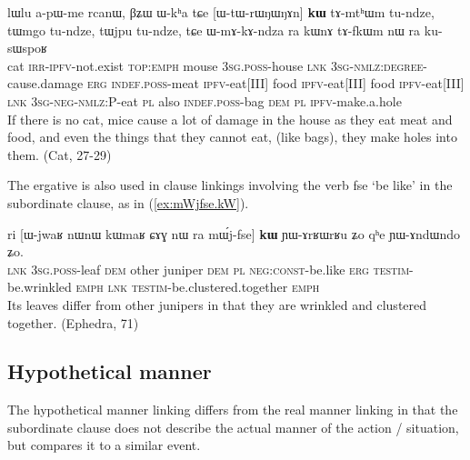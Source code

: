 \documentclass[oldfontcommands,oneside,a4paper,11pt]{article}
\newcommand{\ipa}[1]{{\phon \mbox{#1}}} %
\newcommand{\refb}[1]{(\ref{#1})}
\begin{document}
\begin{exe}
\ex \label{ex:WtWrWNWNAn}
\gll
\ipa{lɯlu}         	\ipa{a-pɯ-me}         	\ipa{rcanɯ,}         	\ipa{βʑɯ}         	\ipa{ɯ-kʰa}         	\ipa{tɕe}         	[\ipa{ɯ-tɯ-rɯŋɯŋɤn}]         	\ipa{\textbf{kɯ}}          \ipa{tɤ-mtʰɯm}         	\ipa{tu-ndze,}         	\ipa{tɯmgo}         	\ipa{tu-ndze,}         	\ipa{tɯjpu}         	\ipa{tu-ndze,}         \ipa{tɕe}         	\ipa{ɯ-mɤ-kɤ-ndza}         	\ipa{ra}         	\ipa{kɯnɤ}         	\ipa{tɤ-fkɯm}         	\ipa{nɯ} \ipa{ra}         	\ipa{ku-sɯspoʁ}         \\
cat \textsc{irr-ipfv}-not.exist \textsc{top:emph} mouse \textsc{3sg.poss}-house \textsc{lnk} \textsc{3sg-nmlz:degree}-cause.damage \textsc{erg} \textsc{indef.poss}-meat \textsc{ipfv}-eat[III] food \textsc{ipfv}-eat[III] food \textsc{ipfv}-eat[III]  \textsc{lnk} \textsc{3sg-neg-nmlz:P}-eat \textsc{pl} also \textsc{indef.poss}-bag \textsc{dem} \textsc{pl} \textsc{ipfv}-make.a.hole \\
\glt  If there is no cat, mice cause a lot of damage in the house as they eat meat and food, and even the things that they cannot eat, (like bags), they make holes into them. (Cat, 27-29)
\end{exe}
 
 
 The ergative is also used in clause linkings involving the verb \ipa{fse} `be like' in the subordinate clause, as in \refb{ex:mWjfse.kW}.
 
 \begin{exe}
\ex \label{ex:mWjfse.kW}
\gll
\ipa{ri} 	[\ipa{ɯ-jwaʁ} 	\ipa{nɯnɯ} 	\ipa{kɯmaʁ} 	\ipa{ɕɤɣ} 	\ipa{nɯ} \ipa{ra} 	\ipa{mɯ́j-fse}] 	\ipa{\textbf{kɯ}} 	\ipa{ɲɯ-ɤrʁɯrʁu} 	\ipa{ʑo} 	\ipa{qʰe} 	\ipa{ɲɯ-ɤndɯndo} 	\ipa{ʑo.} \\
\textsc{lnk} \textsc{3sg.poss}-leaf \textsc{dem} other juniper \textsc{dem} \textsc{pl} \textsc{neg:const}-be.like \textsc{erg} \textsc{testim}-be.wrinkled \textsc{emph} \textsc{lnk}  \textsc{testim}-be.clustered.together \textsc{emph} \\
\glt Its leaves differ from other junipers in that they are wrinkled and clustered together. (Ephedra, 71)
 \end{exe}
 
\subsection{Hypothetical manner}
The hypothetical manner linking differs from the real manner linking in that the subordinate clause does not describe the actual manner of the action / situation, but compares it to a similar event. 
\end{document}
